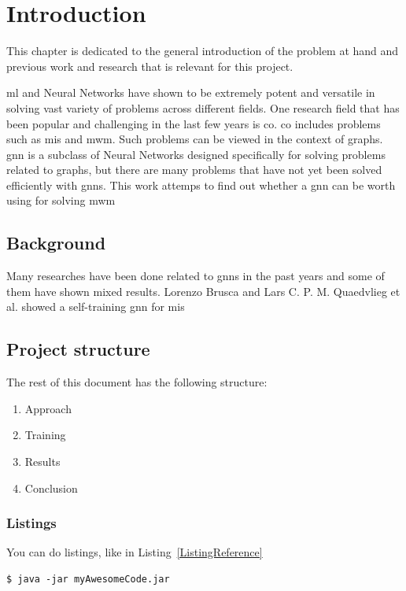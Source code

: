 \chapter{Introduction}

This chapter is dedicated to the general introduction of the problem at hand and previous work and research that is relevant for this project.

\gls{ml} and Neural Networks have shown to be extremely potent and versatile in solving vast variety of problems across different fields. One research field that has been popular and challenging in the last few years is \gls{co}. \gls{co} includes problems such as \gls{mis} and \gls{mwm}. Such problems can be viewed in the context of graphs. \gls{gnn} is a subclass of Neural Networks designed specifically for solving problems related to graphs, but there are many problems that have not yet been solved efficiently with \gls{gnn}s. This work attemps to find out whether a \gls{gnn} can be worth using for solving \gls{mwm} 

\section{Background}

Many researches have been done related to \gls{gnn}s in the past years and some of them have shown mixed results. Lorenzo Brusca and Lars C. P. M. Quaedvlieg et al. \cite{brusca2023maximum} showed a self-training \gls{gnn} for \gls{mis}

\section{Project structure}

The rest of this document has the following structure:

\begin{enumerate}
\item Approach
\item Training
\item Results
\item Conclusion
\end{enumerate}


\subsection{Listings}
You can do listings, like in Listing~\ref{ListingReference}
\begin{lstlisting}[caption={[Short caption]Look at this cool listing. Find the rest in Appendix~\ref{Listing}},label=ListingReference]
$ java -jar myAwesomeCode.jar
\end{lstlisting}

